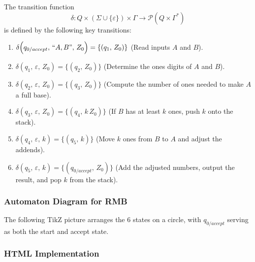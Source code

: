 \documentclass[11pt]{article}
\begin{document}
The transition function 
\[
\delta: Q \times (\Sigma \cup \{\varepsilon\}) \times \Gamma \to \mathcal{P}(Q \times \Gamma^*)
\]
is defined by the following key transitions:
\begin{enumerate}
    \item \(\delta\Bigl(q_{0/accept},\, \text{``}A,B\text{''},\, Z_0\Bigr) = \{(q_1,\, Z_0)\}\) \quad (Read inputs \(A\) and \(B\)).
    \item \(\delta(q_1,\, \varepsilon,\, Z_0) = \{(q_2,\, Z_0)\}\) \quad (Determine the ones digits of \(A\) and \(B\)).
    \item \(\delta(q_2,\, \varepsilon,\, Z_0) = \{(q_3,\, Z_0)\}\) \quad (Compute the number of ones needed to make \(A\) a full base).
    \item \(\delta(q_3,\, \varepsilon,\, Z_0) = \{(q_4,\, k\,Z_0)\}\) \quad (If \(B\) has at least \(k\) ones, push \(k\) onto the stack).
    \item \(\delta(q_4,\, \varepsilon,\, k) = \{(q_5,\, k)\}\) \quad (Move \(k\) ones from \(B\) to \(A\) and adjust the addends).
    \item \(\delta(q_5,\, \varepsilon,\, k) = \{(q_{0/accept},\, Z_0)\}\) \quad (Add the adjusted numbers, output the result, and pop \(k\) from the stack).
\end{enumerate}

\subsubsection*{Automaton Diagram for RMB}

The following TikZ picture arranges the 6 states on a circle, with \(q_{0/accept}\) serving as both the start and accept state.


\subsubsection*{HTML Implementation}


\printbibliography
\end{document}
